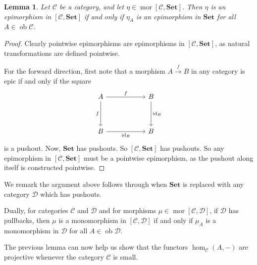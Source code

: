 \documentclass[a4paper,11pt]{article}
\theoremstyle{break_italics}
\newtheorem*{lemma*}{Lemma}
\theoremstyle{break_upright}
\theoremstyle{remark}
\newcommand{\id}{\mathrm{id}}
\newcommand{\ob}{\operatorname{ob}}
\newcommand{\mor}{\operatorname{mor}}
\newcommand{\C}{\mathcal{C}}
\newcommand{\D}{\mathcal{D}}
\newcommand{\Set}{\mathbf{Set}}
\begin{document}
\begin{lemma*}
Let $\C$ be a category, and let $\eta \in \mor [\C,\Set]$. Then $\eta$ is an epimorphism in $[\C,\Set]$ if and only if $\eta_A$ is an epimorphism in $\Set$ for all $A \in \ob\C$.
\end{lemma*}
\begin{proof}
	Clearly pointwise epimorphisms are epimorphisms in $[\C,\Set]$, as natural transformations are defined pointwise.

	For the forward direction, first note that a morphism $A \xrightarrow{f} B$ in any category is epic if and only if the square
	\[\begin{tikzcd}
	A & {} & B \\
	\\
	B && B
	\arrow["f", from=1-1, to=1-3]
	\arrow["f"', from=1-1, to=3-1]
	\arrow["{\id_B}", from=1-3, to=3-3]
	\arrow["{\id_B}"', from=3-1, to=3-3]
\end{tikzcd}\]
is a pushout. Now, $\Set$ has pushouts. So $[\C,\Set]$ has pushouts. So any epimorphism in $[\C,\Set]$ must be a pointwise epimorphism, as the pushout along itself is constructed pointwise.
\end{proof}

We remark the argument above follows through when $\Set$ is replaced with any category $\D$ which has pushouts.

Dually, for categories $\C$ and $\D$ and for morphisms $\mu \in \mor[\C,\D]$, if $\D$ has pullbacks, then $\mu$ is a monomorphism in $[\C,\D]$ if and only if $\mu_A$ is a monomorphism in $\D$ for all $A \in \ob\D$.

The previous lemma can now help us show that the functors $\hom_\C(A, -)$ are projective whenever the category $\C$ is small.
\end{document}
